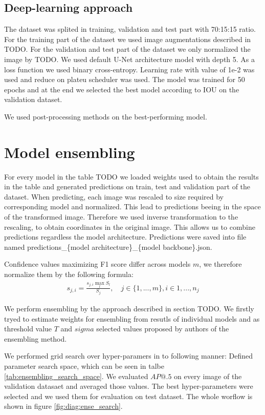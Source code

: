 \subsection{Deep-learning approach}
The dataset was splited in training, validation and test part with 70:15:15 ratio. For the training part of the dataset we used image augmentations described in TODO. For the validation and test part of the dataset we only normalized the image by TODO.
We used default U-Net architecture model with depth 5. As a loss function we used binary cross-entropy. Learning rate with value of 1e-2 was used and reduce on plateu scheduler was used. The model was trained for 50 epochs and at the end we selected the best model according to IOU on the validation dataset.

We used post-processing methods on the best-performing model.



\section{Model ensembling}

For every model in the table TODO we loaded weights used to obtain the results in the table and generated predictions on train, test and validation part of the dataset. When predicting, each image was rescaled to size required by corresponding model and normalized. This lead to predictions beeing in the space of the transformed image. Therefore we used inverse transformation to the rescaling, to obtain coordinates in the original image. This allows us to combine predictions regardless the model architecture.
Predictions were saved into file named predictions\_\{model architecture\}\_\{model backbone\}.json.

Confidence values maximizing F1 score differ across models $m$, we therefore normalize them by the following formula:
\begin{align}
    s_{j,i} = \frac{s_{j,i} \max_l S_l}{  S_j}, \quad j \in \{ 1,...,m\}, i \in {1,...,n_j}
\end{align}

We perform ensembling by the approach described in section TODO. We firstly tryed to estimate weights for ensembling from resutls of individual models and as threshold value $T$ and $sigma$ selected values proposed by authors of the ensembling method.

We performed grid search over hyper-paramers in to following manner: Defined parameter search space, which can be seen in talbe \ref{tab:ensembling_search_space}. We evaluated $AP@.5$ on every image of the validation datasaet and averaged those values. The best hyper-parameters were selected and we used them for evaluation on test dataset. The whole worflow is shown in figure \ref{fig:diag:ense_search}.

